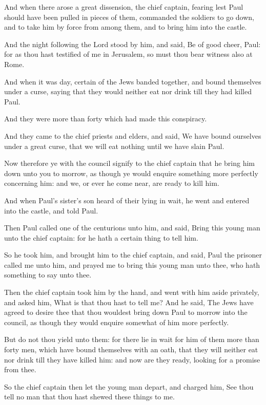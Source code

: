 \Verse And when there arose a great dissension, the chief captain, fearing lest Paul should have been pulled in pieces of them, commanded the soldiers to go down, and to take him by force from among them, and to bring him into the castle.

\Verse And the night following the Lord stood by him, and said, Be of good cheer, Paul: for as thou hast testified of me in Jerusalem, so must thou bear witness also at Rome.

\Verse And when it was day, certain of the Jews banded together, and bound themselves under a curse, saying that they would neither eat nor drink till they had killed Paul.

\Verse And they were more than forty which had made this conspiracy.

\Verse And they came to the chief priests and elders, and said, We have bound ourselves under a great curse, that we will eat nothing until we have slain Paul.

\Verse Now therefore ye with the council signify to the chief captain that he bring him down unto you to morrow, as though ye would enquire something more perfectly concerning him: and we, or ever he come near, are ready to kill him.

\Verse And when Paul's sister's son heard of their lying in wait, he went and entered into the castle, and told Paul.

\Verse Then Paul called one of the centurions unto him, and said, Bring this young man unto the chief captain: for he hath a certain thing to tell him.

\Verse So he took him, and brought him to the chief captain, and said, Paul the prisoner called me unto him, and prayed me to bring this young man unto thee, who hath something to say unto thee.

\Verse Then the chief captain took him by the hand, and went with him aside privately, and asked him, What is that thou hast to tell me?  \Verse And he said, The Jews have agreed to desire thee that thou wouldest bring down Paul to morrow into the council, as though they would enquire somewhat of him more perfectly.

\Verse But do not thou yield unto them: for there lie in wait for him of them more than forty men, which have bound themselves with an oath, that they will neither eat nor drink till they have killed him: and now are they ready, looking for a promise from thee.

\Verse So the chief captain then let the young man depart, and charged him, See thou tell no man that thou hast shewed these things to me.


